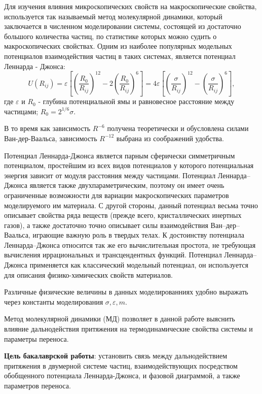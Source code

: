 Для изучения влияния микроскопических свойств на макроскопические свойства, используется так называемый метод молекулярной динамики, который заключается в численном моделировании системы, состоящей из достаточно большого количества частиц, по статистике которых можно судить о макроскопических свойствах. Одним из наиболее популярных модельных потенциалов взаимодействия частиц в таких системах, является потенциал Леннарда - Джонса:
\begin{equation}
U\left(R_{i j}\right)=\varepsilon\left[\left(\frac{R_{0}}{R_{i j}}\right)^{12}-2\left(\frac{R_{0}}{R_{i j}}\right)^{6}\right]=4 \varepsilon\left[\left(\frac{\sigma}{R_{i j}}\right)^{12}-\left(\frac{\sigma}{R_{i j}}\right)^{6}\right], 
\label{eqFullLJ}
\end{equation}
где $\varepsilon$ и $R_0$ - глубина потенциальной ямы и равновесное расстояние между частицами; $R_0 = 2^{1/6}\sigma$.

В то время как зависимость $R^{-6}$ получена теоретически и обусловлена силами Ван-дер-Ваальса, зависимость $R^{-12}$ выбрана из соображений удобства.

Потенциал Леннарда-Джонса является парным сферически симметричным потенциалом, простейшим из всех видов потенциалов у которого потенциальная энергия зависит от модуля расстояния между частицами. Потенциал Леннарда–Джонса является также двухпараметрическим, поэтому он имеет очень ограниченные возможности для вариации макроскопических параметров моделируемого им материала. С другой стороны, данный потенциал весьма точно описывает свойства ряда веществ (прежде всего, кристаллических инертных газов), а также достаточно точно описывает силы взаимодействия Ван–дер–Ваальса, играющие важную роль в твердых телах. К достоинству потенциала Леннарда–Джонса относится так же его вычислительная простота, не требующая вычисления иррациональных и трансцендентных функций. Потенциал Леннарда–Джонса применяется как классический модельный потенциал, он используется для описания физико-химических свойств материалов.

Различные физические величины в данных моделированниях удобно выражать через константы моделирования $\sigma, \varepsilon, m$.

Метод молекулярной динамики (МД) позволяет в данной работе выяснить влияние дальнодействия притяжения на термодинамические свойства системы и параметры переноса.
\newpage

\textbf{Цель бакалаврской работы}: установить связь между дальнодействием притяжения в двумерной системе частиц, взаимодействующих посредством обобщенного потенциала Леннарда-Джонса, и фазовой диаграммой, а также параметров переноса.

